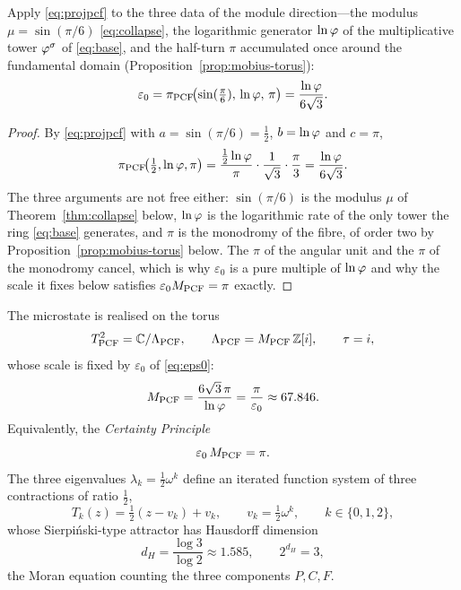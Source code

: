 \begin{theorem}\label{thm:eps0}
Apply \eqref{eq:projpcf} to the three data of the module direction---the modulus
$\mu=\sin(\pi/6)$ \eqref{eq:collapse}, the logarithmic generator $\ln\varphi$ of the
multiplicative tower $\varphi^{\sigma}$ of \eqref{eq:base}, and the half-turn $\pi$ accumulated
once around the fundamental domain (Proposition~\ref{prop:mobius-torus}):
\begin{equation}\label{eq:eps0}
\varepsilon_0=\pi_{\mathrm{PCF}}\!\bigl(\sin(\tfrac{\pi}{6}),\,\ln\varphi,\,\pi\bigr)
=\frac{\ln\varphi}{6\sqrt3}.
\end{equation}
\end{theorem}
\begin{proof}
By \eqref{eq:projpcf} with $a=\sin(\pi/6)=\tfrac12$, $b=\ln\varphi$ and $c=\pi$,
\[
  \pi_{\mathrm{PCF}}\!\bigl(\tfrac12,\ln\varphi,\pi\bigr)
  =\frac{\tfrac12\ln\varphi}{\pi}\cdot\frac{1}{\sqrt3}\cdot\frac{\pi}{3}
  =\frac{\ln\varphi}{6\sqrt3}.
\]
The three arguments are not free either: $\sin(\pi/6)$ is the modulus $\mu$ of
Theorem~\ref{thm:collapse} below, $\ln\varphi$ is the logarithmic rate of the only tower the ring
\eqref{eq:base} generates, and $\pi$ is the monodromy of the fibre, of order two by
Proposition~\ref{prop:mobius-torus} below. The $\pi$ of the angular unit and the $\pi$ of the monodromy
cancel, which is why $\varepsilon_0$ is a pure multiple of $\ln\varphi$ and why the scale it fixes
below satisfies $\varepsilon_0M_{\mathrm{PCF}}=\pi$ exactly.
\end{proof}

\begin{remark}
The microstate is realised on the torus
\begin{equation}\label{eq:torus}
T^2_{\mathrm{PCF}}=\mathbb{C}/\Lambda_{\mathrm{PCF}},\qquad \Lambda_{\mathrm{PCF}}=M_{\mathrm{PCF}}\,\mathbb{Z}[i],\qquad \tau=i ,
\end{equation}
whose scale is fixed by $\varepsilon_0$ of \eqref{eq:eps0}:
\begin{equation}\label{eq:Mpcf}
M_{\mathrm{PCF}}=\frac{6\sqrt3\,\pi}{\ln\varphi}=\frac{\pi}{\varepsilon_0}\approx 67.846 .
\end{equation}
Equivalently, the \emph{Certainty Principle}
\begin{equation}\label{certainty_product}
\varepsilon_0\,M_{\mathrm{PCF}}=\pi .
\end{equation}
The three eigenvalues $\lambda_k=\tfrac12\omega^{k}$ define an iterated function
system of three contractions of ratio $\tfrac12$,
\begin{equation}\label{eq:IFS}
T_k(z)=\tfrac12(z-v_k)+v_k,\qquad v_k=\tfrac12\omega^{k},\qquad k\in\{0,1,2\},
\end{equation}
whose Sierpi\'nski-type attractor has Hausdorff dimension
\begin{equation}\label{eq:hausdorff}
d_H=\frac{\log3}{\log2}\approx 1.585,\qquad 2^{d_H}=3 ,
\end{equation}
the Moran equation counting the three components $P,C,F$.
\end{remark}

